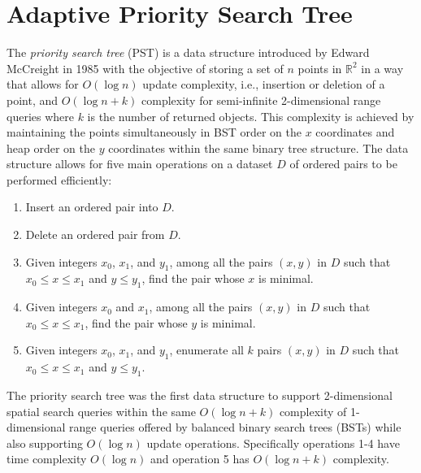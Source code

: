 \documentclass{article}
\begin{document}
\section{Adaptive Priority Search Tree}

The {\em priority search tree} (PST) is a data structure introduced by Edward McCreight in 1985 with the objective of storing a set of $n$ points in $\mathbb{R}^2$ in a way that allows for $O(\log n)$ update complexity, i.e., insertion or deletion of a point, and $O(\log n + k)$ complexity for semi-infinite 2-dimensional range queries where $k$ is the number of returned objects. This complexity is achieved by maintaining the points simultaneously in BST order on the $x$ coordinates and heap order on the $y$ coordinates within the same binary tree structure. The data structure allows for five main operations on a dataset $D$ of ordered pairs to be performed efficiently:
\begin{enumerate}
\item Insert an ordered pair into $D$.
\item Delete an ordered pair from $D$.
\item Given integers $x_0$, $x_1$, and $y_1$, among all the pairs $(x, y)$ in $D$ such that $x_0 \leq x \leq x_1$ and $y \leq y_1$, find the pair whose $x$ is minimal.
\item Given integers $x_0$ and $x_1$, among all the pairs $(x, y)$ in $D$ such that $x_0 \leq x \leq x_1$, find the pair whose $y$ is minimal.
\item Given integers $x_0$, $x_1$, and $y_1$, enumerate all $k$ pairs $(x, y)$ in $D$ such that $x_0 \leq x \leq x_1$ and $y \leq y_1$.
\end{enumerate}
The priority search tree was the first data structure to support 2-dimensional spatial search queries within the same $O(\log n + k)$ complexity of 1-dimensional range queries offered by balanced binary search trees (BSTs) while also supporting $O(\log n)$ update operations. Specifically operations 1-4 have time complexity $O(\log n)$ and operation 5 has $O(\log n + k)$ complexity. 
\end{document}
